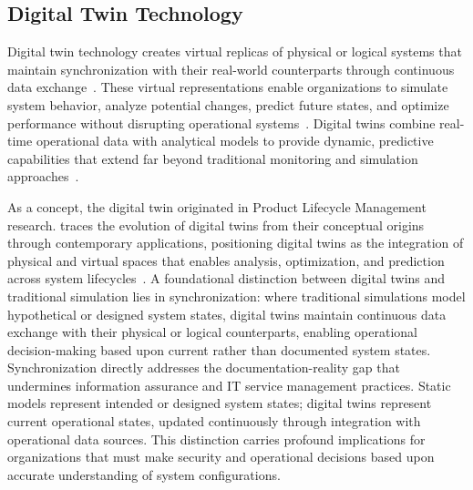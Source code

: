 \subsection{Digital Twin Technology}

Digital twin technology creates virtual replicas of physical or logical systems that maintain synchronization with their real-world counterparts through continuous data exchange~\parencite{Shao_2021}. These virtual representations enable organizations to simulate system behavior, analyze potential changes, predict future states, and optimize performance without disrupting operational systems~\parencite{madni2018leveraging}. Digital twins combine real-time operational data with analytical models to provide dynamic, predictive capabilities that extend far beyond traditional monitoring and simulation approaches~\parencite{Khan_Saad_Niyato_Han_Hong_2022}.

As a concept, the digital twin originated in Product Lifecycle Management research. \citeauthor{Grieves_2023} traces the evolution of digital twins from their conceptual origins through contemporary applications, positioning digital twins as the integration of physical and virtual spaces that enables analysis, optimization, and prediction across system lifecycles~\parencite{Grieves_2023}. A foundational distinction between digital twins and traditional simulation lies in synchronization: where traditional simulations model hypothetical or designed system states, digital twins maintain continuous data exchange with their physical or logical counterparts, enabling operational decision-making based upon current rather than documented system states. Synchronization directly addresses the documentation-reality gap that undermines information assurance and IT service management practices. Static models represent intended or designed system states; digital twins represent current operational states, updated continuously through integration with operational data sources. This distinction carries profound implications for organizations that must make security and operational decisions based upon accurate understanding of system configurations.


